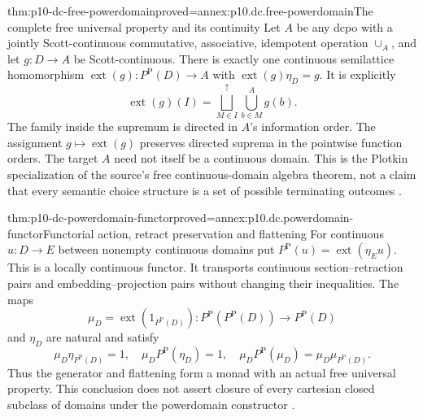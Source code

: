 \begin{hbtheorem}{thm:p10-dc-free-powerdomain}{proved=annex:p10.dc.free-powerdomain}{The complete free universal property and its continuity}
Let \(A\) be any dcpo with a jointly Scott-continuous commutative,
associative, idempotent operation \(\cup_A\), and let \(g:D\to A\)
be Scott-continuous. There is exactly one continuous semilattice
homomorphism \(\operatorname{ext}(g):P^{\mathrm P}(D)\to A\)
with \(\operatorname{ext}(g)\eta_D=g\). It is explicitly
\[
 \operatorname{ext}(g)(I)=
 \bigsqcup^{\uparrow}_{M\in I}
                 \mathop{\bigcup}_{b\in M}^{A}g(b).
\]
The family inside the supremum is directed in \(A\)'s information
order. The assignment \(g\mapsto\operatorname{ext}(g)\) preserves
directed suprema in the pointwise function orders.
The target \(A\) need not itself be a continuous domain.
This is the Plotkin specialization of the source's free
continuous-domain algebra theorem, not a claim that every semantic
choice structure is a set of possible terminating outcomes
\cite[Theorems~6.1.6--7; Proposition~6.1.8; Theorem~6.2.3,
pp.~89--91,94]{AbramskyJungCorrectedExpandedDomainTheory}.
\end{hbtheorem}

\begin{hbtheorem}{thm:p10-dc-powerdomain-functor}{proved=annex:p10.dc.powerdomain-functor}{Functorial action, retract preservation and flattening}
For continuous \(u:D\to E\) between nonempty continuous domains put
\(P^{\mathrm P}(u)=\operatorname{ext}(\eta_Eu)\).
This is a locally continuous functor. It transports continuous
section--retraction pairs and embedding--projection pairs without
changing their inequalities. The maps
\[
 \mu_D=\operatorname{ext}(1_{P^{\mathrm P}(D)}):
       P^{\mathrm P}(P^{\mathrm P}(D))\to P^{\mathrm P}(D)
\]
and \(\eta_D\) are natural and satisfy
\[
 \mu_D\eta_{P^{\mathrm P}(D)}=1,
 \quad\mu_DP^{\mathrm P}(\eta_D)=1,
 \quad\mu_DP^{\mathrm P}(\mu_D)=\mu_D\mu_{P^{\mathrm P}(D)}.
\]
Thus the generator and flattening form a monad with an actual free
universal property. This conclusion does not assert closure of every
cartesian closed subclass of domains under the powerdomain constructor
\cite[Theorem~6.1.9; pp.~91,93--95]
{AbramskyJungCorrectedExpandedDomainTheory}.
\end{hbtheorem}

